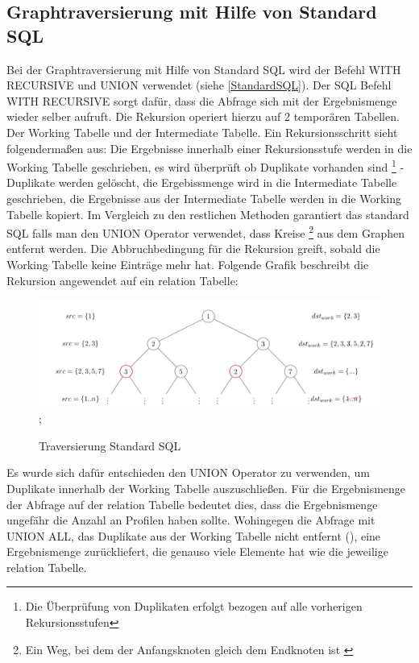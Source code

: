 \subsection{Graphtraversierung mit Hilfe von Standard \ac{SQL}}
Bei der Graphtraversierung mit Hilfe von Standard \ac{SQL} wird der Befehl WITH RECURSIVE und UNION verwendet (siehe \ref{StandardSQL}). Der SQL Befehl WITH RECURSIVE
sorgt dafür, dass die Abfrage sich mit der Ergebnismenge wieder selber aufruft. Die Rekursion operiert hierzu auf 2 temporären Tabellen. Der Working Tabelle und der Intermediate
Tabelle. Ein Rekursionsschritt sieht folgendermaßen aus: Die Ergebnisse innerhalb einer Rekursionsstufe werden in die Working Tabelle geschrieben, es wird überprüft ob Duplikate
vorhanden sind \footnote{Die Überprüfung von Duplikaten erfolgt bezogen auf alle vorherigen Rekursionsstufen} - Duplikate werden gelöscht, die Ergebissmenge wird in
die Intermediate Tabelle geschrieben, die Ergebnisse aus der Intermediate Tabelle werden in die Working Tabelle kopiert. Im Vergleich zu den restlichen Methoden garantiert
das standard SQL falls man den UNION Operator verwendet, dass Kreise \footnote{Ein Weg, bei dem der Anfangsknoten gleich dem Endknoten ist \cite[S.48]{pbeck01}} aus dem Graphen entfernt werden.
Die Abbruchbedingung für die Rekursion greift, sobald die Working Tabelle keine Einträge mehr hat. Folgende Grafik beschreibt die Rekursion angewendet auf ein relation
Tabelle:
\begin{figure}[H]
    \includegraphics[width = \linewidth]{images/RecursiveSelect.jpg};
    \caption{Traversierung Standard SQL}
\end{figure}
Es wurde sich dafür entschieden den UNION Operator zu verwenden, um Duplikate innerhalb der Working Tabelle auszuschließen. Für die  Ergebnismenge der Abfrage auf der
relation Tabelle bedeutet dies, dass die Ergebnismenge ungefähr die Anzahl an Profilen haben sollte. Wohingegen die Abfrage mit UNION ALL, das Duplikate aus der
Working Tabelle nicht entfernt (\cite{postgresWithRecursive}), eine Ergebnismenge zurückliefert, die genauso viele Elemente hat wie die jeweilige relation Tabelle.

